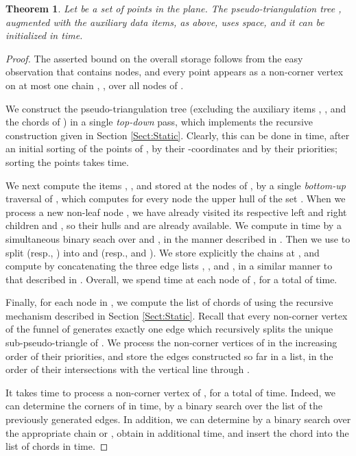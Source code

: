 \documentclass[11pt]{article}
\newtheorem{theorem}{Theorem}[section]
\begin{document}
\begin{theorem}\label{Thm:InitStructure}
  Let  be a set of  points in the plane.  The
  pseudo-triangulation tree , augmented with the auxiliary data items,
  as above, uses  space, and it can be initialized in  time.
\end{theorem}
\begin{proof}
  The asserted bound on the overall storage follows from the easy
  observation that  contains  nodes, and every point
   appears as a non-corner vertex on at most one chain
  , , over all nodes  of .

  We construct the pseudo-triangulation tree  (excluding the
  auxiliary items , ,  and
  the chords of ) in a single \textit{top-down} pass, which implements the recursive construction given in Section \ref{Sect:Static}.  Clearly, this can be done
  in  time, after an initial sorting of the points of , by their
  -coordinates and by their priorities; sorting the points
  takes
   time.


  We next compute the items , , and 
  stored at the nodes  of , by a single \textit{bottom-up}
  traversal of , which computes for every node  the upper
  hull  of the set .
  When we process a new non-leaf node , we have already visited
  its respective left and right children  and , so their hulls  and  are already available.  We compute
   in  time by a simultaneous binary seach
  over  and , in the manner described in
  \cite{Overmars}. Then we use  
  to split  (resp.,
  ) into  and  (resp., 
  and ).  We store explicitly the chains   at
  , and compute  by concatenating the three edge lists
  , , and , in a similar manner to that described in \cite{AKS}. Overall, we spend
   time at each node of , for a total of
   time.

  Finally, for each node  in , we compute the list of chords of
   using the recursive mechanism described in Section \ref{Sect:Static}.
  Recall that every non-corner vertex  of the funnel of  generates
  exactly one edge  which recursively splits the unique
  sub-pseudo-triangle  of . We process the non-corner
  vertices of  in the increasing order of their
  priorities, and store the edges constructed so far in a list, in
  the order of their intersections with the vertical line through
  .

  It takes  time to process a non-corner vertex  of
  , for a total of  time. Indeed, we can determine the
  corners of  in  time, by a binary search over the
  list of the previously generated edges. In addition, we can
  determine  by a binary search over the appropriate chain
   or , obtain  in  additional time, and insert the chord  into the list of chords in  time.
\end{proof}
\end{document}
